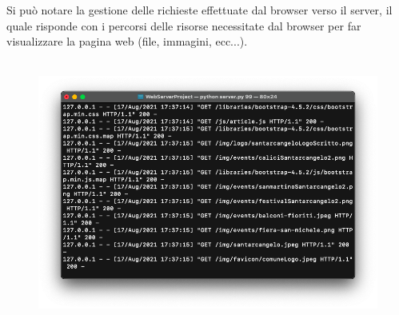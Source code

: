 \documentclass[a4paper,12pt]{report}
\begin{document}
\clearpage

Si può notare la gestione delle richieste effettuate dal browser verso il server, il quale risponde con i percorsi delle risorse necessitate dal browser per far visualizzare la pagina web (file, immagini, ecc...).
\\
\\
\begin{figure}[ht]
    \begin{center}
        \centering
        \includegraphics[width=\textwidth]{img/Terminale2.png}
    \end{center}
\end{figure}
\end{document}
